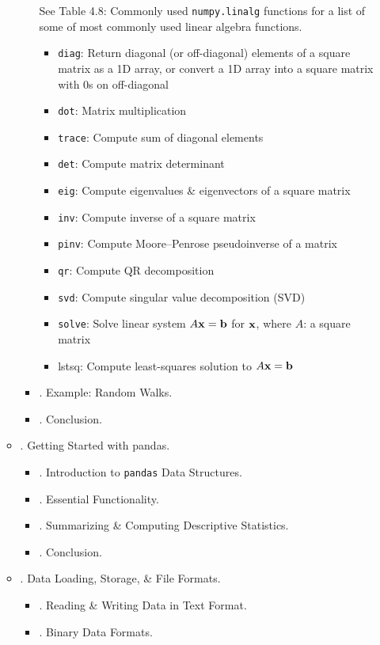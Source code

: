 \documentclass{article}
\begin{document}
\begin{enumerate}
\begin{itemize}
\begin{itemize}
			See {\sf Table 4.8: Commonly used {\tt numpy.linalg} functions} for a list of some of most commonly used linear algebra functions.
			\begin{itemize}
				\item {\tt diag}: Return diagonal (or off-diagonal) elements of a square matrix as a 1D array, or convert a 1D array into a square matrix with 0s on off-diagonal
				\item {\tt dot}: Matrix multiplication
				\item {\tt trace}: Compute sum of diagonal elements
				\item {\tt det}: Compute matrix determinant
				\item {\tt eig}: Compute eigenvalues \& eigenvectors of a square matrix
				\item {\tt inv}: Compute inverse of a square matrix
				\item {\tt pinv}: Compute Moore--Penrose pseudoinverse of a matrix
				\item {\tt qr}: Compute QR decomposition
				\item {\tt svd}: Compute singular value decomposition (SVD)
				\item {\tt solve}: Solve linear system $A{\bf x} = {\bf b}$ for ${\bf x}$, where $A$: a square matrix
				\item {\sf lstsq}: Compute least-squares solution to $A{\bf x} = {\bf b}$
			\end{itemize}
			\item {. Example: Random Walks.}
			\item {. Conclusion.}
		\end{itemize}
		\item {. Getting Started with pandas.}
		\begin{itemize}
			\item {. Introduction to {\tt pandas} Data Structures.}
			\item {. Essential Functionality.}
			\item {. Summarizing \& Computing Descriptive Statistics.}
			\item {. Conclusion.}
		\end{itemize}
		\item {. Data Loading, Storage, \& File Formats.}
		\begin{itemize}
			\item {. Reading \& Writing Data in Text Format.}
			\item {. Binary Data Formats.}

\end{itemize}
\end{itemize}
\end{enumerate}
\end{document}
